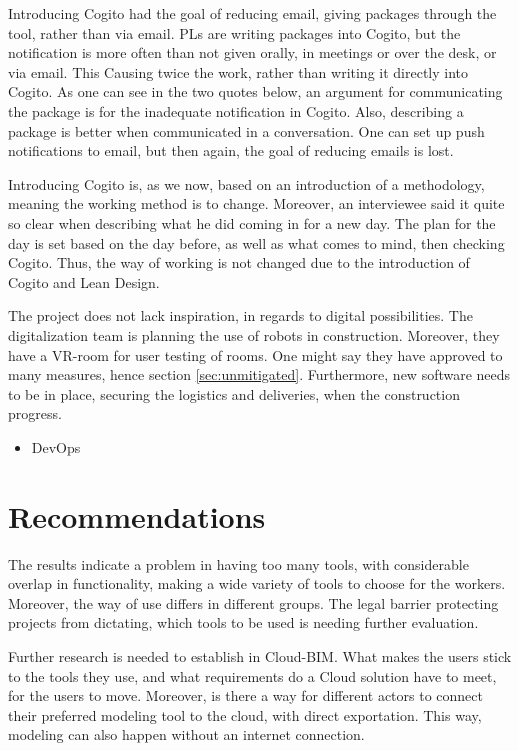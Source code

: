 Introducing Cogito had the goal of reducing email, giving packages through the tool, rather than via email. PLs are writing packages into Cogito, but the notification is more often than not given orally, in meetings or over the desk, or via email. This Causing twice the work, rather than writing it directly into Cogito. As one can see in the two quotes below, an argument for communicating the package is for the inadequate notification in Cogito. Also, describing a package is better when communicated in a conversation. One can set up push notifications to email, but then again, the goal of reducing emails is lost. 

Introducing Cogito is, as we now, based on an introduction of a methodology, meaning the working method is to change. Moreover, an interviewee said it quite so clear when describing what he did coming in for a new day. The plan for the day is set based on the day before, as well as what comes to mind, then checking Cogito. Thus, the way of working is not changed due to the introduction of Cogito and Lean Design.

The project does not lack inspiration, in regards to digital possibilities. The digitalization team is planning the use of robots in construction. Moreover, they have a VR-room for user testing of rooms. One might say they have approved to many measures, hence section \ref{sec:unmitigated}. Furthermore, new software needs to be in place, securing the logistics and deliveries, when the construction progress. 

\begin{itemize}
    \item DevOps
\end{itemize}

\section{Recommendations}
The results indicate a problem in having too many tools, with considerable overlap in functionality, making a wide variety of tools to choose for the workers. Moreover, the way of use differs in different groups. The legal barrier protecting projects from dictating, which tools to be used is needing further evaluation. 

Further research is needed to establish in Cloud-BIM. What makes the users stick to the tools they use, and what requirements do a Cloud solution have to meet, for the users to move. Moreover, is there a way for different actors to connect their preferred modeling tool to the cloud, with direct exportation. This way, modeling can also happen without an internet connection. 

